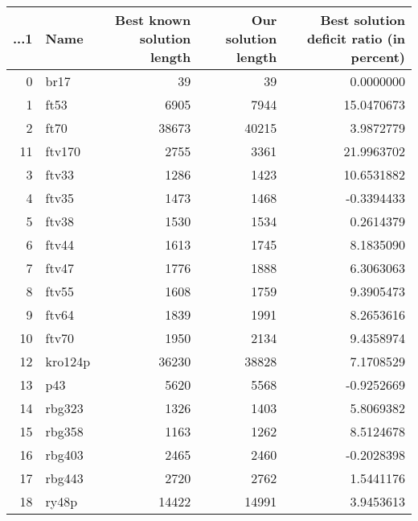 \begin{table}
\centering
\begin{tabular}{r|l|r|r|r}
\hline
...1 & Name & Best known solution length & Our solution length & Best solution deficit ratio (in percent)\\
\hline
0 & br17 & 39 & 39 & 0.0000000\\
\hline
1 & ft53 & 6905 & 7944 & 15.0470673\\
\hline
2 & ft70 & 38673 & 40215 & 3.9872779\\
\hline
11 & ftv170 & 2755 & 3361 & 21.9963702\\
\hline
3 & ftv33 & 1286 & 1423 & 10.6531882\\
\hline
4 & ftv35 & 1473 & 1468 & -0.3394433\\
\hline
5 & ftv38 & 1530 & 1534 & 0.2614379\\
\hline
6 & ftv44 & 1613 & 1745 & 8.1835090\\
\hline
7 & ftv47 & 1776 & 1888 & 6.3063063\\
\hline
8 & ftv55 & 1608 & 1759 & 9.3905473\\
\hline
9 & ftv64 & 1839 & 1991 & 8.2653616\\
\hline
10 & ftv70 & 1950 & 2134 & 9.4358974\\
\hline
12 & kro124p & 36230 & 38828 & 7.1708529\\
\hline
13 & p43 & 5620 & 5568 & -0.9252669\\
\hline
14 & rbg323 & 1326 & 1403 & 5.8069382\\
\hline
15 & rbg358 & 1163 & 1262 & 8.5124678\\
\hline
16 & rbg403 & 2465 & 2460 & -0.2028398\\
\hline
17 & rbg443 & 2720 & 2762 & 1.5441176\\
\hline
18 & ry48p & 14422 & 14991 & 3.9453613\\
\hline
\end{tabular}
\end{table}
